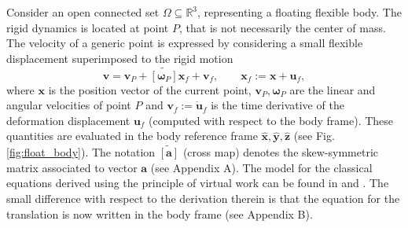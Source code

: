 \documentclass{svjour3}                     %
\newcommand{\crmat}[1]{\ensuremath{\widetilde{\left[#1\right]}}}
\begin{document}
	Consider an open connected set $\Omega \subseteq \mathbb{R}^3$, representing a floating flexible body.  The rigid dynamics is located at point $P$, that is not necessarily the center of mass. The velocity of a generic point is expressed by considering a small flexible displacement superimposed to the rigid motion
	\[
	\bm{v} = \bm{v}_P + \crmat{\bm{\omega}_P}\bm{x}_f + \bm{v}_f,  \qquad \bm{x}_f := \bm{x}+\bm{u}_f,
	\]
	where $\bm{x}$ is the position vector of the current point, $\bm{v}_P, \bm{\omega}_P$ are the linear and angular velocities of point $P$  and $\bm{v}_f := \dot{\bm{u}}_f$ is the time derivative of the deformation displacement $\bm{u}_f$ (computed with respect to the body frame). These quantities are evaluated in the body reference frame $\widehat{\bm{x}}, \widehat{\bm{y}}, \widehat{\bm{z}}$ (see Fig. \ref{fig:float_body}). The notation $\crmat{\bm{a}}$ (cross map) denotes the skew-symmetric matrix associated to vector $\bm{a}$ (see Appendix A). The model for the classical equations derived using the principle of virtual work can be found in \cite{MB_Daepde} and \cite[Chapter 4]{simeon2013computational}. The small difference with respect to the derivation therein is that the equation for the translation is now written in the body frame (see Appendix B). 
\end{document}
